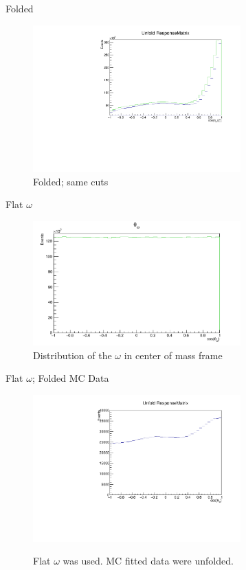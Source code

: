 \documentclass[
		10pt
		]{beamer}
\begin{document}
\begin{frame}{Folded}
	\begin{figure}
		\includegraphics[width=8cm]{Plots/WholeUnfold35.pdf}
		\captionsetup{labelformat=empty}
		\caption{Folded; same cuts}
	\end{figure}
\end{frame}

\begin{frame}{Flat $\omega$}
	\begin{figure}
		\includegraphics[width=8cm]{Plots/OmegaFlat.pdf}
		\captionsetup{labelformat=empty}
		\caption{Distribution of the $\omega$ in center of mass frame}
	\end{figure}
\end{frame}

\fi

\begin{frame}{Flat $\omega$; Folded MC Data}
	\begin{figure}
		\includegraphics[width=8cm]{Plots/FlatMC.pdf}\\
		\captionsetup{labelformat=empty}
		\caption{Flat $\omega$ was used. MC fitted data were unfolded.}
	\end{figure}
\end{frame}
\end{document}
